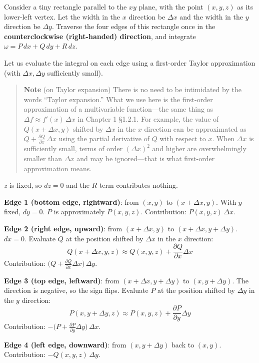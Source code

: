 \documentclass[a4paper,12pt,openany]{book}
\begin{document}
Consider a tiny rectangle parallel to the \(xy\) plane, with the point
\((x, y, z)\) as its lower-left vertex. Let the width in the \(x\)
direction be \(\Delta x\) and the width in the \(y\) direction be
\(\Delta y\). Traverse the four edges of this rectangle once in the
\textbf{counterclockwise (right-handed) direction}, and integrate
\(\omega = P\,dx + Q\,dy + R\,dz\).

Let us evaluate the integral on each edge using a first-order Taylor
approximation (with \(\Delta x, \Delta y\) sufficiently small).

\begin{quote}
\textbf{Note} (on Taylor expansion) There is no need to be intimidated
by the words ``Taylor expansion.'' What we use here is the first-order
approximation of a multivariable function—the same thing as
\(\Delta f \approx f'(x)\,\Delta x\) in Chapter 1 §1.2.1. For example,
the value of \(Q(x+\Delta x, y)\) shifted by \(\Delta x\) in the \(x\)
direction can be approximated as
\(Q + \frac{\partial Q}{\partial x}\,\Delta x\) using the partial
derivative of \(Q\) with respect to \(x\). When \(\Delta x\) is
sufficiently small, terms of order \((\Delta x)^2\) and higher are
overwhelmingly smaller than \(\Delta x\) and may be ignored—that is
what first-order approximation means.
\end{quote}

\(z\) is fixed, so \(dz=0\) and the \(R\) term contributes nothing.

\textbf{Edge 1 (bottom edge, rightward)}: from \((x, y)\) to
\((x+\Delta x, y)\). With \(y\) fixed, \(dy=0\). \(P\) is approximately
\(P(x, y, z)\). Contribution: \(P(x, y, z)\,\Delta x\).

\textbf{Edge 2 (right edge, upward)}: from \((x+\Delta x, y)\) to
\((x+\Delta x, y+\Delta y)\). \(dx=0\). Evaluate \(Q\) at the position
shifted by \(\Delta x\) in the \(x\) direction:
\[Q(x+\Delta x, y, z) \approx Q(x, y, z) + \frac{\partial Q}{\partial x}\Delta x\]
Contribution:
\(\bigl(Q + \frac{\partial Q}{\partial x}\Delta x\bigr)\,\Delta y\).

\textbf{Edge 3 (top edge, leftward)}: from \((x+\Delta x, y+\Delta y)\)
to \((x, y+\Delta y)\). The direction is negative, so the sign flips.
Evaluate \(P\) at the position shifted by \(\Delta y\) in the \(y\)
direction:
\[P(x, y+\Delta y, z) \approx P(x, y, z) + \frac{\partial P}{\partial y}\Delta y\]
Contribution:
\(-\bigl(P + \frac{\partial P}{\partial y}\Delta y\bigr)\,\Delta x\).

\textbf{Edge 4 (left edge, downward)}: from \((x, y+\Delta y)\) back to
\((x, y)\). Contribution: \(-Q(x, y, z)\,\Delta y\).
\end{document}
